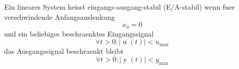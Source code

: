 Ein lineares System heisst eingangs-ausgang-stabil (E/A-stabil) wenn fuer verschwindende Anfangsauslenkung
$$x_0 = 0$$
und ein beliebiges beschraenktes Eingangssignal 
$$\forall t > 0 : | \operatorname{u}(t) | < u_{\mathrm{max}}$$
das Ausgangssignal beschraenkt bleibt
$$\forall t > 0 : | \operatorname{y}(t) | < y_{\mathrm{max}}$$


